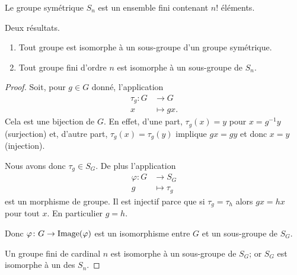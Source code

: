 \begin{lemma}        \label{LEMooSGWKooKFIDyT}
    Le groupe symétrique \( S_n\) est un ensemble fini contenant \( n!\) éléments.
\end{lemma}

\begin{lemma}        \label{LEMooUPBOooWbwMTx}
    Deux résultats.
    \begin{enumerate}
        \item
            Tout groupe est isomorphe à un sous-groupe d'un groupe symétrique.
        \item
            Tout groupe fini d'ordre \( n\) est isomorphe à un sous-groupe de \( S_n\).
    \end{enumerate}
\end{lemma}

\begin{proof}
    Soit, pour \( g\in G\) donné, l'application
    \begin{equation}
        \begin{aligned}
            \tau_g\colon G&\to G \\
            x&\mapsto gx.
        \end{aligned}
    \end{equation}
    Cela est une bijection de \( G\). En effet, d'une part, \( \tau_g(x)=y\) pour \( x=g^{-1} y\) (surjection) et, d'autre part, \( \tau_g(x)=\tau_g(y)\) implique \( gx=gy\) et donc \( x=y\) (injection).

    Nous avons donc \( \tau_g\in S_G\). De plus l'application
    \begin{equation}
        \begin{aligned}
            \varphi\colon G&\to S_G \\
            g&\mapsto \tau_g
        \end{aligned}
    \end{equation}
    est un morphisme de groupe. Il est injectif parce que si \( \tau_g=\tau_h\) alors \( gx=hx\) pour tout \( x\). En particulier \( g=h\).

    Donc \( \varphi\colon G\to \operatorname{Image}(\varphi)\) est un isomorphisme entre \( G\) et un sous-groupe de \( S_G\).

    Un groupe fini de cardinal \( n\) est isomorphe à un sous-groupe de \( S_G\); or \( S_G\) est isomorphe à un des \( S_n\).
\end{proof}
